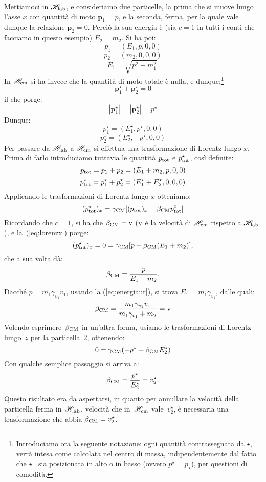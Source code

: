 \begin{esempio} Mettiamoci in $\mathscr{H}_{\mathrm{lab}}$, e consideriamo due particelle, la prima
che si muove lungo l'asse $x$ con quantit\`a di moto
$\mathbf{p}_1=p$, e la seconda, ferma, per la quale vale dunque la
relazione $\mathbf{p}_2=0$. Perci\`o la sua energia \`e (sia $c=1$
in tutti i conti che facciamo in questo esempio) $E_2=m_2$. Si ha
poi:
\begin{equation}
 p_1=(E_1,p,0,0)
\end{equation}
\begin{equation}
 p_2=(m_2,0,0,0)
\end{equation}
\begin{equation}
E_1=\sqrt{p^2+m_1^2}.\label{eq:energiaur}
\end{equation}
In $\mathscr{H}_{\mathrm{cm}}$ si ha invece che la quantit\`a di moto totale \`e nulla,
e dunque:\footnote{Introduciamo ora la seguente notazione: ogni
quantit\`a contrassegnata da $\star$, verr\`a intesa come
calcolata nel centro di massa, indipendentemente dal fatto che
$\star$ \ sia posizionata in alto o in basso (ovvero
$p^{\star}=p_{\star}$), per questioni di comodit\`a.}
$$
\mathbf{p}_1^{\star}+\mathbf{p}_2^{\star}=0
$$
il che porge:
$$
|\mathbf{p}_1^{\star}|=|\mathbf{p}_2^{\star}|=p^{\star}
$$
Dunque:
$$
p_1^{\star}=(E_1^{\star},p^{\star},0,0)
$$
$$
p_2^{\star}=(E_2^{\star},-p^{\star},0,0)
$$
Per passare da $\mathscr{H}_{\mathrm{lab}}$ a $\mathscr{H}_{\mathrm{cm}}$ si effettua una trasformazione di
Lorentz lungo $x$. Prima di farlo introduciamo tuttavia le
quantit\`a $p_{\mathrm{tot}}$ e $p_{\mathrm{tot}}^{\star}$, cos\`i
definite:
$$
p_{\mathrm{tot}}=p_1+p_2=(E_1+m_2,p,0,0)
$$
$$
p_{\mathrm{tot}}^{\star}=p_1^{\star}+p_2^{\star}=(E_1^{\star}+E_2^{\star},0,0,0)
$$
Applicando le trasformazioni di Lorentz lungo $x$ otteniamo:
\begin{equation}
(p_{\mathrm{tot}}^{\star})_x=\gamma_{\mathrm{CM}}[(p_{\mathrm{tot}})_x -
\beta_{\mathrm{CM}}p_{\mathrm{tot}}^{0}] \label{eq:lorenzx}
\end{equation}
Ricordando che $c=1$, si ha che $\beta_{\mathrm{CM}}=\mathrm{v}$
($\mathrm{v}$ \`e la velocit\`a di $\mathscr{H}_{\mathrm{cm}}$ rispetto a $\mathscr{H}_{\mathrm{lab}}$), e
la~(\ref{eq:lorenzx}) porge:
$$
(p_{\mathrm{tot}}^{\star})_x = 0
=\gamma_{\mathrm{CM}}[p-\beta_{\mathrm{CM}}(E_1+m_2)],
$$
che a sua volta d\`a:
$$
\beta_{\mathrm{CM}}=\frac{p}{E_1+m_2}.
$$
Dacch\'e $p=m_1\gamma_{v_1}v_1$, usando la (\ref{eq:energiaur}),
si trova $E_1=m_1\gamma_{v_1}$, dalle quali:
$$
\beta_{\mathrm{CM}}=\frac{m_1\gamma_{v_1}v_1}{m_1\gamma_{v_1}+m_2}=\mathrm{v} 
$$
Volendo esprimere~$\beta_{\mathrm{CM}}$ in un'altra forma, usiamo le
trasformazioni di Lorentz lungo~$z$ per la particella~2,
ottenendo:
$$
0=\gamma_{\mathrm{CM}}(-p^{\star}+\beta_{\mathrm{CM}}E_2^{\star})
$$
Con qualche semplice passaggio si arriva a:
\begin{equation}
\beta_{\mathrm{CM}}=\frac{p^{\star}}{E^{\star}_2}=v_2^{\star}.
\label{eq:beta}
\end{equation}
Questo risultato era da aspettarsi, in quanto per annullare la
velocit\`a della particella ferma in~$\mathscr{H}_{\mathrm{lab}}$, velocit\`a che
in~$\mathscr{H}_{\mathrm{cm}}$ vale~$v_2^{\star}$, \`e necessaria una trasformazione
che abbia $\beta_{\mathrm{CM}}=v_2^{\star}$.
\end{esempio}
